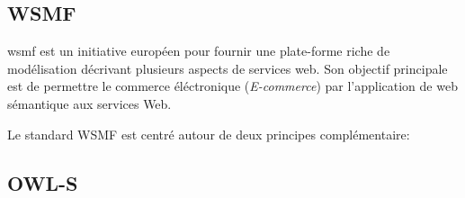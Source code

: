     \subsection{WSMF}
    \label{sec:wsmf}    
    \acrshort{wsmf} \cite{fensel2002web}est un initiative européen
    pour fournir une plate-forme riche de modélisation décrivant
    plusieurs aspects de services web. Son objectif principale est de
    permettre le commerce éléctronique (\emph{E-commerce}) par
    l'application de web sémantique aux services Web.

    Le standard \textsc{WSMF} est centré autour de deux principes
    complémentaire:
    



    \newpage
    \subsection{OWL-S}
    \label{sec:owl-s}

